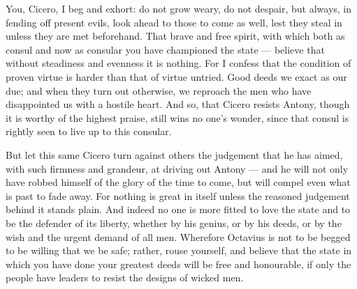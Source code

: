  You, Cicero, I beg and exhort: do not grow weary, do not despair, but always, in fending off present evils, look ahead to those to come as well, lest they steal in unless they are met beforehand. That brave and free spirit, with which both as consul and now as consular you have championed the state --- believe that without steadiness and evenness it is nothing. For I confess that the condition of proven virtue is harder than that of virtue untried. Good deeds we exact as our due; and when they turn out otherwise, we reproach the men who have disappointed us with a hostile heart. And so, that Cicero resists Antony, though it is worthy of the highest praise, still wins no one's wonder, since that consul is rightly seen to live up to this consular.

 But let this same Cicero turn against others the judgement that he has aimed, with such firmness and grandeur, at driving out Antony --- and he will not only have robbed himself of the glory of the time to come, but will compel even what is past to fade away. For nothing is great in itself unless the reasoned judgement behind it stands plain. And indeed no one is more fitted to love the state and to be the defender of its liberty, whether by his genius, or by his deeds, or by the wish and the urgent demand of all men. Wherefore Octavius is not to be begged to be willing that we be safe; rather, rouse yourself, and believe that the state in which you have done your greatest deeds will be free and honourable, if only the people have leaders to resist the designs of wicked men.
